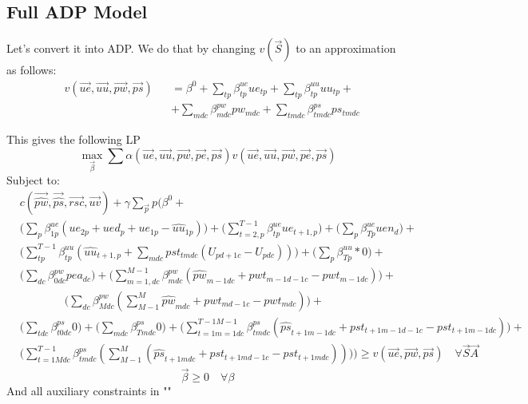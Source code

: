 \documentclass{article}
\begin{document}
\subsection{Full ADP Model}
Let's convert it into ADP. We do that by changing $v(\vec{S})$ to an approximation as follows:
\begin{equation}\begin{alignedat}{10}
	& v(\vec{ue}, \vec{uu}, \vec{pw}, \vec{ps}) 
		&& =  \beta^0 + \sum_{tp} \beta_{tp}^{ue} ue_{tp} +
			\sum_{tp} \beta_{tp}^{uu} uu_{tp} + \\
		& && + \sum_{mdc} \beta_{mdc}^{pw} pw_{mdc}  + 
			\sum_{tmdc} \beta_{tmdc}^{ps} ps_{tmdc}
\end{alignedat} \end{equation}

This gives the following LP
\begin{equation}
	\max_{\vec{\beta}} \sum \alpha (\vec{ue}, \vec{uu}, \vec{pw}, \vec{pe}, \vec{ps}) v(\vec{ue}, \vec{uu}, \vec{pw}, \vec{pe}, \vec{ps})
\end{equation}
Subject to:
\begin{equation}\begin{alignedat}{10}
\label{full-adp-equation}
	& c(\vec{\hat{pw}}, \vec{\hat{ps}}, \vec{rsc}, \vec{uv}) + \gamma \sum_{\vec{p}} p \Bigg( 
		\beta^0 + \\
	& 	\bigg( \sum_{p} \beta_{1p}^{ue} 
			(ue_{2p} + ued_{p} + ue_{1p} - \hat{uu}_{1p}) \bigg)+
		\bigg( \sum_{t=2,p}^{T-1} \beta_{tp}^{ue} ue_{t+1,p} \bigg)+ 
		\bigg( \sum_{p} \beta_{Tp}^{ue} uen_{d} \bigg) + \\
	& 	\bigg( \sum_{tp}^{T-1} \beta_{tp}^{uu} 
			( \hat{uu}_{t+1,p} + \sum_{mdc} pst_{tmdc} (U_{pd+1c} - U_{pdc})) \bigg) +
		\bigg( \sum_{p} \beta_{Tp}^{uu} * 0 \bigg) + \\
	& 	\bigg( \sum_{dc} \beta_{0dc}^{pw} pea_{dc} \bigg) +
		\bigg( \sum_{m=1,dc}^{M-1} \beta_{mdc}^{pw} 
			(\hat{pw}_{m-1dc} + pwt_{m-1d-1c} - pwt_{m-1dc}) \bigg) + \\
	&	\qquad \qquad \bigg( \sum_{dc} \beta_{Mdc}^{pw} 
			(\sum_{M-1}^{M} \hat{pw}_{mdc} + pwt_{md-1c} - pwt_{mdc})\bigg) + \\
	& 	\bigg( \sum_{tdc} \beta_{t0dc}^{ps} 0 \bigg) +
		\bigg( \sum_{mdc} \beta_{Tmdc}^{ps} 0 \bigg) +
		\bigg( \sum_{t=1m=1dc}^{T-1M-1} \beta_{tmdc}^{ps} 
			(\hat{ps}_{t+1m-1dc} + pst_{t+1m-1d-1c} - pst_{t+1m-1dc}) \bigg) + \\	
	&	\bigg( \sum_{t=1Mdc}^{T-1} \beta_{tmdc}^{ps} 
			(\sum_{M-1}^{M} (\hat{ps}_{t+1mdc} + pst_{t+1md-1c} - pst_{t+1mdc})) \bigg)
	\Bigg) \ge v(\vec{ue}, \vec{pw}, \vec{ps}) \quad \forall \vec{S} \vec{A}
\end{alignedat} \end{equation}
\begin{equation}
	\vec{\beta} \ge 0 \quad \forall \beta
\end{equation}
And all auxiliary constraints in ""
\end{document}
